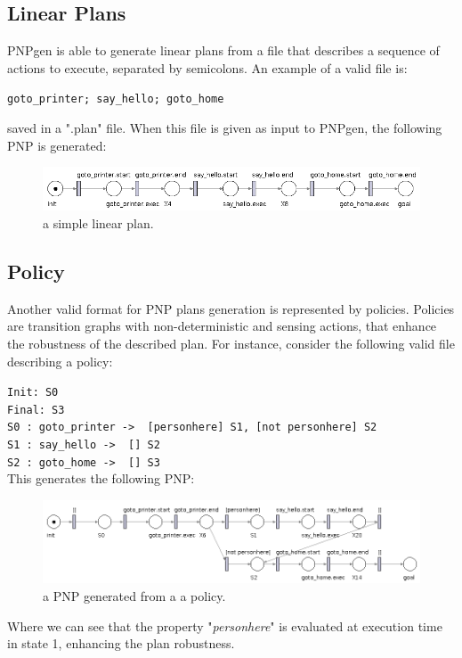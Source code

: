 \documentclass[pdftex,12pt,a4paper]{report}
\begin{document}
\subsection{Linear Plans}
PNPgen is able to generate linear plans from a file that describes a sequence of actions to execute, separated by semicolons. An example of a valid file is:
\begin{center}
\texttt{goto\_printer; say\_hello; goto\_home}
\end{center}
saved in a ".plan" file. When this file is given as input to PNPgen, the following PNP is generated:
\begin{figure}[H]
	\includegraphics[scale=0.6]{images/linear_plan.png}
	\caption{a simple linear plan.}
\end{figure}

\subsection{Policy}
Another valid format for PNP plans generation is represented by policies. Policies are transition graphs with non-deterministic and sensing actions, that enhance the robustness of the described plan.
For instance, consider the following valid file describing a policy:

\noindent\texttt{Init: S0\\
Final: S3\\
S0 : goto\_printer -> { [personhere] S1, [not personhere] S2 } \\
S1 : say\_hello -> { [] S2 } \\
S2 : goto\_home -> { [] S3 }}\\

\noindent This generates the following PNP:
\begin{figure}[H]
	\includegraphics[scale=0.5]{images/SimplePolicy.png}
	\caption{a PNP generated from a a policy.}
\end{figure}
\noindent Where we can see that the property "\textit{personhere}" is evaluated at execution time in state 1, enhancing the plan robustness.
\end{document}
